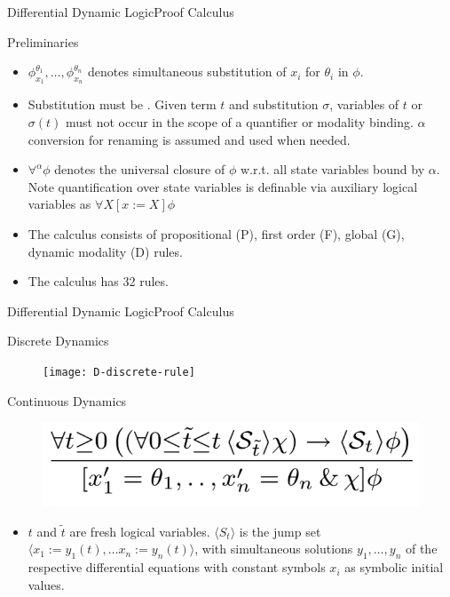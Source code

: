 \documentclass{beamer}
\begin{document}
\begin{frame}{Differential Dynamic Logic}{Proof Calculus}
  \begin{block}{Preliminaries}
    \begin{itemize}
      \item $\phi_{x_1}^{\theta_1}, \ldots, \phi_{x_n}^{\theta_n}$ denotes
        simultaneous substitution of $x_i$ for $\theta_i$ in $\phi$.
      \item Substitution must be . Given term $t$ and
        substitution $\sigma$, variables of $t$ or $\sigma(t)$ must not occur in
        the scope of a quantifier or modality binding. $\alpha$ conversion for
        renaming is assumed and used when needed.
      \item $\forall^{\alpha}\phi$ denotes the universal closure of $\phi$
        w.r.t. all state variables bound by $\alpha$. Note
        quantification over state variables is definable
        via auxiliary logical variables as $\forall X [x := X] \phi$
      \item The calculus consists of propositional (P), first order (F),
        global (G), dynamic modality (D) rules.
      \item The calculus has 32 rules.
    \end{itemize}
  \end{block}
\end{frame}
\begin{frame}{Differential Dynamic Logic}{Proof Calculus}
  \begin{block}{Discrete Dynamics}
  \begin{figure}
    \centering
    \texttt{[image: D-discrete-rule]}
  \end{figure}
\end{block}
  \begin{block}{Continuous Dynamics}
  \begin{figure}
    \centering
    \includegraphics[scale=0.5]{D-continuous-rule}
  \end{figure}
  \begin{itemize}
    \item $t$ and $\tilde{t}$ are fresh logical variables. $\langle S_t \rangle$ is the jump set
      $\langle x_1 := y_1(t), \dots x_n := y_n(t) \rangle$, with simultaneous
      solutions $y_1, \ldots, y_n$ of the respective differential equations with
      constant symbols $x_i$ as symbolic initial values.
  \end{itemize}
\end{block}
\end{frame}
\end{document}

